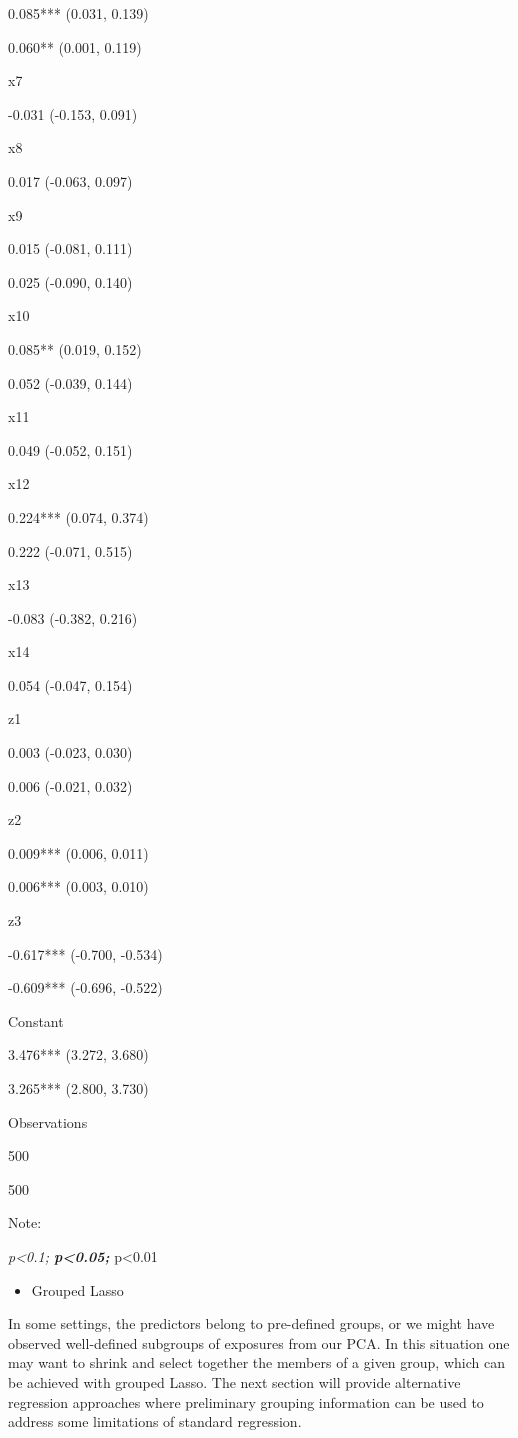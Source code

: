 \documentclass[
]{book}
\providecommand{\tightlist}{%
  \setlength{\itemsep}{0pt}\setlength{\parskip}{0pt}}
\begin{document}
0.085*** (0.031, 0.139)

0.060** (0.001, 0.119)

x7

-0.031 (-0.153, 0.091)

x8

0.017 (-0.063, 0.097)

x9

0.015 (-0.081, 0.111)

0.025 (-0.090, 0.140)

x10

0.085** (0.019, 0.152)

0.052 (-0.039, 0.144)

x11

0.049 (-0.052, 0.151)

x12

0.224*** (0.074, 0.374)

0.222 (-0.071, 0.515)

x13

-0.083 (-0.382, 0.216)

x14

0.054 (-0.047, 0.154)

z1

0.003 (-0.023, 0.030)

0.006 (-0.021, 0.032)

z2

0.009*** (0.006, 0.011)

0.006*** (0.003, 0.010)

z3

-0.617*** (-0.700, -0.534)

-0.609*** (-0.696, -0.522)

Constant

3.476*** (3.272, 3.680)

3.265*** (2.800, 3.730)

Observations

500

500

Note:

\emph{p\textless0.1; \textbf{p\textless0.05; }}p\textless0.01

\begin{itemize}
\tightlist
\item
  Grouped Lasso
\end{itemize}

In some settings, the predictors belong to pre-defined groups, or we might have observed well-defined subgroups of exposures from our PCA. In this situation one may want to shrink and select together the members of a given group, which can be achieved with grouped Lasso. The next section will provide alternative regression approaches where preliminary grouping information can be used to address some limitations of standard regression.
\end{document}
